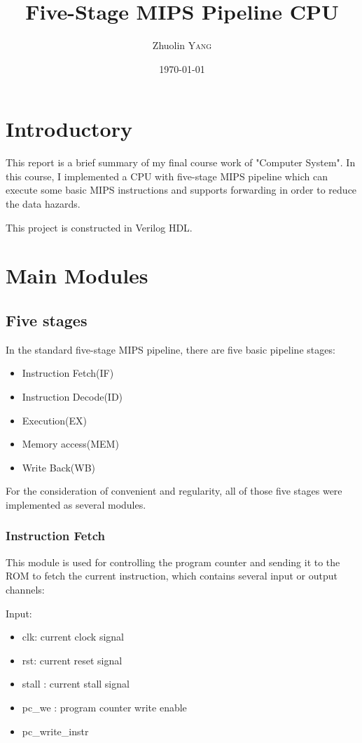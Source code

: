 \documentclass{article}
\title{Five-Stage MIPS Pipeline CPU}
\author{Zhuolin \textsc{Yang}}
\date{\today}
\begin{document}
\maketitle


\tableofcontents
\newpage

\section{Introductory}
This report is a brief summary of my final course work of "Computer System". In this course, I implemented a CPU with five-stage MIPS pipeline which can execute some basic MIPS instructions and supports forwarding in order to reduce the data hazards.

This project is constructed in Verilog HDL.

\section{Main Modules}

\subsection{Five stages}
In the standard five-stage MIPS pipeline, there are five basic pipeline stages:
\begin{itemize}
\item
Instruction Fetch(IF)
\item
Instruction Decode(ID)
\item
Execution(EX)
\item
Memory access(MEM)
\item
Write Back(WB)
\end{itemize}

For the consideration of convenient and regularity, all of those five stages were implemented as several modules.

\subsubsection{Instruction Fetch}
This module is used for controlling the program counter and sending it to the ROM to fetch the current instruction, which contains several input or output channels:

Input:

\begin{itemize}
\item clk: current clock signal
\item rst: current reset signal
\item stall : current stall signal
\item pc\_we : program counter write enable
\item pc\_write\_instr
\end{itemize}
\end{document}
